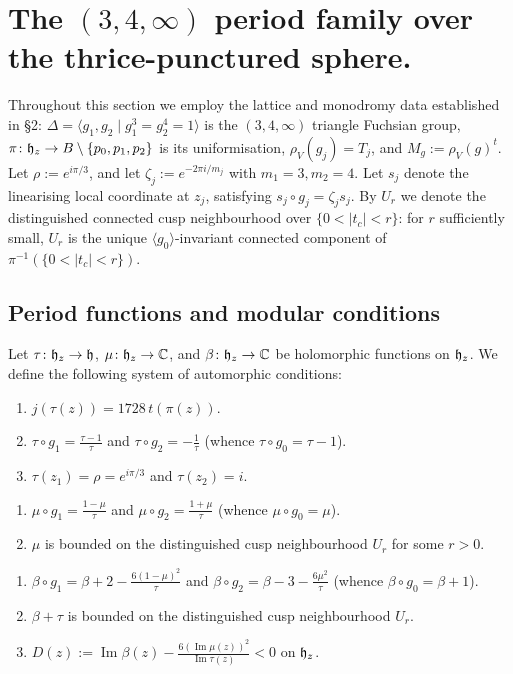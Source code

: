 \section{The $(3,4,\infty)$ period family over the thrice-punctured sphere.}

Throughout this section we employ the lattice and monodromy data established in \S2:
$\Delta = \langle g_1, g_2 \mid g_1^3 = g_2^4 = 1\rangle$ is the $(3,4,\infty)$ triangle Fuchsian group,
$\pi \colon \mathfrak{h}_z \to B \setminus \{p_0, p_1, p_2\}$ is its uniformisation,
$\rho_V(g_j) = T_j$, and $M_g := \rho_V(g)^t$.
Let $\rho := e^{i\pi/3}$, and let $\zeta_j := e^{-2\pi i/m_j}$ with $m_1 = 3, m_2 = 4$.
Let $s_j$ denote the linearising local coordinate at $z_j$, satisfying $s_j \circ g_j = \zeta_j s_j$.
By $U_r$ we denote the distinguished connected cusp neighbourhood over $\{0 < |t_c| < r\}$:
for $r$ sufficiently small, $U_r$ is the unique $\langle g_0\rangle$-invariant connected component of $\pi^{-1}(\{0 < |t_c| < r\})$.

\subsection{Period functions and modular conditions}

\begin{definition}\label{def:period-conditions}
Let $\tau \colon \mathfrak{h}_z \to \mathfrak{h}$, $\mu \colon \mathfrak{h}_z \to \mathbb{C}$, and $\beta \colon \mathfrak{h}_z \to \mathbb{C}$ be holomorphic functions on $\mathfrak{h}_z$.
We define the following system of automorphic conditions:
\begin{enumerate}[label=$(\tau\arabic*)$]
    \item $j(\tau(z)) = 1728\, t(\pi(z))$.
    \item $\tau \circ g_1 = \frac{\tau - 1}{\tau}$ and $\tau \circ g_2 = -\frac{1}{\tau}$ (whence $\tau \circ g_0 = \tau - 1$).
    \item $\tau(z_1) = \rho = e^{i\pi/3}$ and $\tau(z_2) = i$.
\end{enumerate}
\begin{enumerate}[label=$(\mu\arabic*)$]
    \item $\mu \circ g_1 = \frac{1 - \mu}{\tau}$ and $\mu \circ g_2 = \frac{1 + \mu}{\tau}$ (whence $\mu \circ g_0 = \mu$).
    \item $\mu$ is bounded on the distinguished cusp neighbourhood $U_r$ for some $r > 0$.
\end{enumerate}
\begin{enumerate}[label=$(\beta\arabic*)$]
    \item $\beta \circ g_1 = \beta + 2 - \frac{6(1-\mu)^2}{\tau}$ and $\beta \circ g_2 = \beta - 3 - \frac{6\mu^2}{\tau}$ (whence $\beta \circ g_0 = \beta + 1$).
    \item $\beta + \tau$ is bounded on the distinguished cusp neighbourhood $U_r$.
    \item $D(z) := \operatorname{Im}\beta(z) - \frac{6(\operatorname{Im}\mu(z))^2}{\operatorname{Im}\tau(z)} < 0$ on $\mathfrak{h}_z$.
\end{enumerate}
\end{definition}

